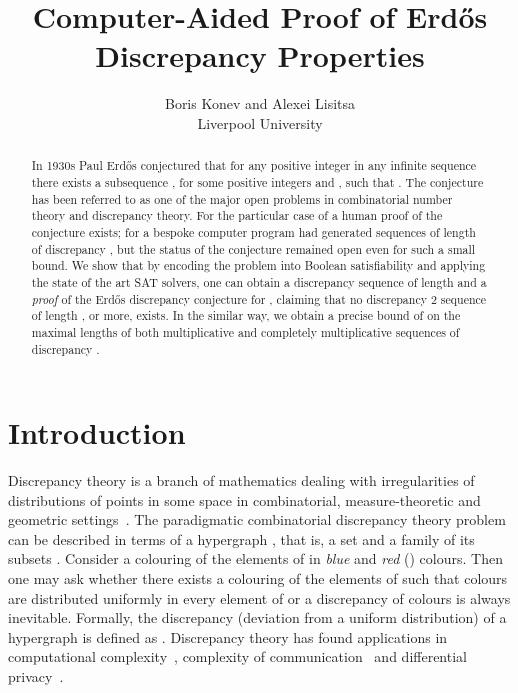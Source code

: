 \documentclass{article} \usepackage[utf8]{inputenc}
\begin{document}
\title{Computer-Aided Proof of Erd\H{o}s Discrepancy Properties}
\author{Boris Konev    and
Alexei Lisitsa \\{Liverpool University}
}

\date{}
\maketitle


\begin{abstract}
In 1930s Paul Erd\H{o}s conjectured that for any positive integer  in any
infinite  sequence  there exists a subsequence , for some positive integers  and , such that
.  
The conjecture has been referred to  as one of the major open problems in 
combinatorial number theory and discrepancy theory.  
For the particular case of  a human proof of the conjecture exists; for
 a bespoke computer program had generated sequences of length 
of discrepancy ,
but the status of the conjecture remained open even for such a small bound.
We show that by encoding the problem into Boolean satisfiability and applying the 
state of the art SAT solvers, one can obtain a discrepancy  sequence of length 
and a \emph{proof} of the Erd\H{o}s discrepancy conjecture for
, claiming that no discrepancy 2 sequence of length , or more, exists.    
In the similar way, we obtain a precise bound of  on the maximal
lengths of both multiplicative and completely multiplicative sequences of discrepancy
.
\end{abstract}
\section{Introduction}
Discrepancy theory is a branch of mathematics dealing with 
irregularities of distributions of points in some space in combinatorial, measure-theoretic
and geometric settings~\cite{Beck,Chazelle,Matusek,BeckSos}. 
The paradigmatic combinatorial discrepancy theory  problem can be described in
terms of a hypergraph , that is, a set   and a family
of its subsets . 
Consider a colouring  of the elements of  in  
\emph{blue}  and \emph{red}  () colours. Then one may ask whether there 
exists a colouring of the elements of  such that colours are
distributed uniformly in every element of  or a discrepancy of colours is always inevitable.
Formally, the discrepancy (deviation from a uniform distribution) of a hypergraph  is defined as
.
Discrepancy theory has found applications 
in {computational complexity}~\cite{Chazelle},
complexity of communication~\cite{DBLP:journals/dam/Alon92}
and {differential privacy}~\cite{Muthukrishnan:2012:OPH:2213977.2214090}. 
\end{document}
